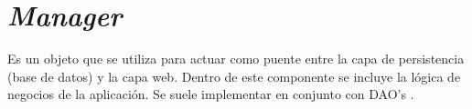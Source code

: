 \section{\textit{Manager}}

Es un objeto que se utiliza para actuar como puente entre la capa de persistencia (base de datos) y la capa web. Dentro de este componente se incluye la lógica de negocios de la aplicación. Se suele implementar en conjunto con DAO's \cite{MNG0}. 
